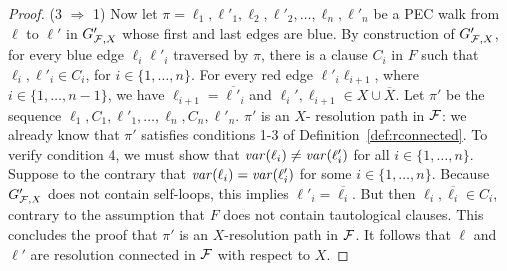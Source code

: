 \documentclass{llncs}
\def\hy{\hbox{-}\nobreak\hskip0pt} \newcommand{\ellipsis}{$\dots$}
\begin{document}
\begin{proof}
  (3 $\Rightarrow$ 1) Now let $\pi = \ell_1, \ell'_1, \ell_2,\ell'_2, \dots,
  \ell_n, \ell'_n$ be a PEC walk from $\ell$ to $\ell'$ in $G'_{\mathcal{F},X}$ whose
  first and last edges are blue. By construction of $G'_{\mathcal{F},X}$, for every
  blue edge $\ell_i \ell'_i$ traversed by $\pi$, there is a clause $C_i$ in
  $F$ such that $\ell_i,\ell'_i \in C_i$, for $i \in \{ 1, \dots, n \}$. For
  every red edge $\ell'_i\ell_{i+1}$, where $i \in \{ 1, \dots, n-1 \}$, we
  have $\ell_{i+1} = \overline{\ell'_i}$ and $\ell_i',\ell_{i+1} \in X \cup
  \overline{X}$. Let $\pi'$ be the sequence $\ell_1, C_1,
  \ell'_1,\dots,$\hskip 0pt$\ell_n,C_n,\ell'_n$. $\pi'$ is an $X$\hy
  resolution path in $\mathcal{F}$: we already know that $\pi'$ satisfies conditions
  1-3 of Definition~\ref{def:rconnected}. To verify condition 4, we must show
  that $\mathit{var}(\ell_i) \neq \mathit{var}(\ell'_i)$ for all $i \in \{ 1, \dots, n
  \}$. Suppose to the contrary that $\mathit{var}(\ell_i) = \mathit{var}(\ell'_i)$ for some $i
  \in \{1,\dots,n\}$. Because $G'_{\mathcal{F},X}$ does not contain self\hy loops,
  this implies $\ell'_i = \overline{\ell_i}$. But then $\ell_i,
  \overline{\ell_i} \in C_i$, contrary to the assumption that $F$ does not
  contain tautological clauses. This concludes the proof that $\pi'$ is an
  $X$\hy resolution path in $\mathcal{F}$. It follows that $\ell$ and $\ell'$ are
  resolution connected in $\mathcal{F}$ with respect to $X$.
\end{proof}
\end{document}
